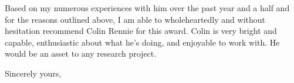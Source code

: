 \documentclass[11pt]{letter} %
\begin{document}
\begin{letter}{}
Based on my numerous experiences with him over the past year and a half and for the reasons outlined above, I am 
able to wholeheartedly and without hesitation recommend Colin Rennie for this award. Colin is very bright and capable, 
enthusiastic about what he's doing, and enjoyable to work with. He would be an asset to any research project. 


\closing{Sincerely yours,
\\
}

\end{letter}
\end{document}
